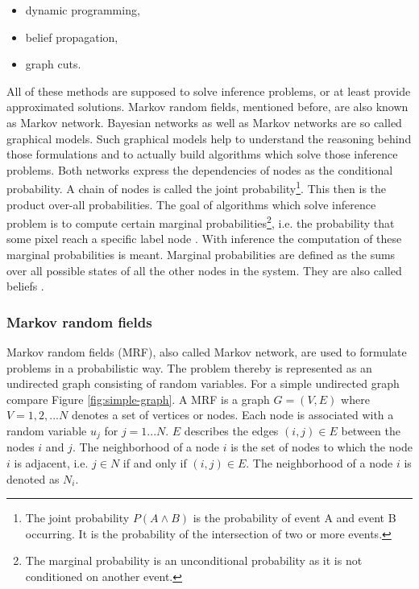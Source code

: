\begin{itemize}
  \item dynamic programming,
  \item belief propagation,
  \item graph cuts.
\end{itemize}

\noindent All of these methods are supposed to solve inference problems, or at least provide approximated solutions.
Markov random fields, mentioned before, are also known as Markov network.
Bayesian networks as well as Markov networks are so called graphical models.
Such graphical models help to understand the reasoning behind those formulations and to actually build algorithms which solve those inference problems.
Both networks express the dependencies of nodes as the conditional probability.
A chain of nodes is called the joint probability\footnote{The joint probability $P(A \land B)$ is the probability of event A and event B occurring. It is the probability of the intersection of two or more events.}.
This then is the product over-all probabilities.
The goal of algorithms which solve inference problem is to compute certain marginal probabilities\footnote{The marginal probability is an unconditional probability as it is not conditioned on another event.}, i.e. the probability that some pixel reach a specific label node \citep{cyganek2011introduction}.
With inference the computation of these marginal probabilities is meant.
Marginal probabilities are defined as the sums over all possible states of all the other nodes in the system.
They are also called beliefs \citep{yedidia2003understanding}.

\subsubsection{Markov random fields}

Markov random fields (MRF), also called Markov network, are used to formulate problems in a probabilistic way.
The problem thereby is represented as an undirected graph consisting of random variables.
For a simple undirected graph compare Figure \ref{fig:simple-graph}.
\newline\newline\noindent A MRF is a graph $G = (V, E)$ where $V = {1,2,...N}$ denotes a set of vertices or nodes.
Each node is associated with a random variable $u_j$ for $j = 1...N$.
$E$ describes the edges $(i,j) \in E$ between the nodes $i$ and $j$.
The neighborhood of a node $i$ is the set of nodes to which the node $i$ is adjacent, i.e. $j \in N$ if and only if $(i,j) \in E$.
The neighborhood of a node $i$ is denoted as $N_i$.

